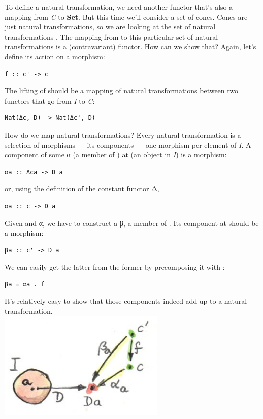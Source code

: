 To define a natural transformation, we need another functor that's also
a mapping from \emph{C} to \textbf{Set}. But this time we'll consider a
set of cones. Cones are just natural transformations, so we are looking
at the set of natural transformations . The mapping
from  to this particular set of natural transformations is a
(contravariant) functor. How can we show that? Again, let's define its
action on a morphism:

\begin{verbatim}
f :: c' -> c
\end{verbatim}

The lifting of  should be a mapping of natural transformations
between two functors that go from \emph{I} to \emph{C}:

\begin{verbatim}
Nat(Δc, D) -> Nat(Δc', D)
\end{verbatim}

How do we map natural transformations? Every natural transformation is a
selection of morphisms --- its components --- one morphism per element
of \emph{I}. A component of some α (a member of ) at
 (an object in \emph{I}) is a morphism:

\begin{verbatim}
αa :: Δca -> D a
\end{verbatim}

or, using the definition of the constant functor Δ,

\begin{verbatim}
αa :: c -> D a
\end{verbatim}

Given  and α, we have to construct a β, a member of
. Its component at  should be a
morphism:

\begin{verbatim}
βa :: c' -> D a
\end{verbatim}

We can easily get the latter from the former by precomposing it with
:

\begin{verbatim}
βa = αa . f
\end{verbatim}

It's relatively easy to show that those components indeed add up to a
natural transformation.\\
\includegraphics[width=3.12500in]{images/natmapping.jpg}

